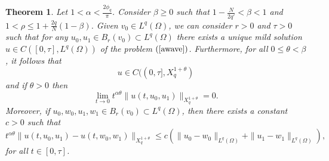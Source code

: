 \documentclass[12pt,reqno]{amsart}
\newtheorem{theorem}{Theorem}
\begin{document}
\begin{theorem}\label{existence1}
	Let $1<\alpha<\frac{2\phi_q}{\pi}$. Consider $\beta \ge 0$ such that $1-\frac{N}{2q'}<\beta<1$ and $1<\rho\leq 1+\frac{2q}{N}(1-\beta )$. Given $v_0\in L^{q}(\Omega)$, we can consider $r>0$ and $\tau >0$ such that for any $u_0, u_1\in B_{r}(v_0)\subset L^{q}(\Omega)$ there exists a unique mild solution $u\in C([0,\tau ], L^{q}(\Omega))$ of the problem $(\ref{awave})$. Furthermore, for all $0\le\theta<\beta$, it follows that
	$$u\in C((0,\tau ],X_{q}^{1+\theta})$$
	and if $\theta>0$ then
	$$\lim_{t\to0}t^{\alpha\theta}\|u(t,u_0,u_1)\|_{X_{q}^{1+\theta}}= 0.$$
	Moreover, if $u_0, w_0, u_1, w_1\in B_r(v_0)\subset L^{q}(\Omega)$, then there exists a constant $c>0$ such that
	$$t^{\alpha\theta}\|u(t,u_0,u_1)-u(t,w_0,w_1)\|_{X_{q}^{1+\theta}}\le c\left(\|u_0 - w_0\|_{L^{q}(\Omega)}+\|u_1 - w_1\|_{L^{q}(\Omega)}\right),$$
	for all $t\in[0, \tau]$.
\end{theorem}
\end{document}
